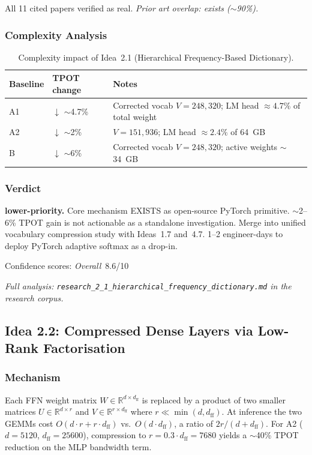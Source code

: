 \documentclass[11pt]{article}
\begin{document}
\noindent
All 11 cited papers verified as real.
\emph{Prior art overlap: exists ($\sim$90\%).}

\subsubsection*{Complexity Analysis}

\begin{table}[h]
\centering
\caption{Complexity impact of Idea~2.1 (Hierarchical Frequency-Based Dictionary).}
\label{tab:complexity-2-1}
\begin{tabular}{llp{7cm}}
\toprule
\textbf{Baseline} & \textbf{TPOT change} & \textbf{Notes} \\
\midrule
A1 & $\downarrow$ $\sim$4.7\% & Corrected vocab $V=248{,}320$; LM head $\approx 4.7\%$ of total weight \\
A2 & $\downarrow$ $\sim$2\%   & $V=151{,}936$; LM head $\approx 2.4\%$ of 64~GB \\
B  & $\downarrow$ $\sim$6\%   & Corrected vocab $V=248{,}320$; active weights $\sim$34~GB \\
\bottomrule
\end{tabular}
\end{table}

\subsubsection*{Verdict}
\textbf{lower-priority.}
Core mechanism EXISTS as open-source PyTorch primitive.
$\sim$2--6\% TPOT gain is not actionable as a standalone investigation.
Merge into unified vocabulary compression study with Ideas~1.7 and~4.7.
1--2 engineer-days to deploy PyTorch adaptive softmax as a drop-in.

\noindent
Confidence scores:
\emph{Overall}~8.6/10
\par\noindent\textit{Full analysis: \texttt{research\_2\_1\_hierarchical\_frequency\_dictionary.md} in the research corpus.}


\subsection{Idea 2.2: Compressed Dense Layers via Low-Rank Factorisation}
\label{subsec:idea-2-2}

\subsubsection*{Mechanism}
Each FFN weight matrix $W \in \mathbb{R}^{d \times d_\text{ff}}$ is replaced by a product of two smaller matrices $U \in \mathbb{R}^{d \times r}$ and $V \in \mathbb{R}^{r \times d_\text{ff}}$ where $r \ll \min(d, d_\text{ff})$.
At inference the two GEMMs cost $O(d{\cdot}r + r{\cdot}d_\text{ff})$ vs.\ $O(d{\cdot}d_\text{ff})$, a ratio of $2r/(d+d_\text{ff})$.
For A2 ($d=5120$, $d_\text{ff}=25600$), compression to $r = 0.3 \cdot d_\text{ff} = 7680$ yields a $\sim$40\% TPOT reduction on the MLP bandwidth term.
\end{document}
